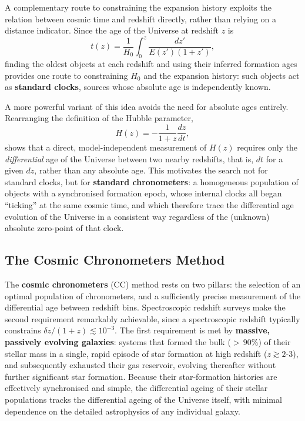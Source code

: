 A complementary route to constraining the expansion history exploits the relation between cosmic time and redshift directly, rather than relying on a distance indicator. Since the age of the Universe at redshift $z$ is
$$
t(z) = \frac{1}{H_0}\int_0^z \frac{dz'}{E(z')(1+z')} ,
$$
finding the oldest objects at each redshift and using their inferred formation ages provides one route to constraining $H_0$ and the expansion history: such objects act as \textbf{standard clocks}, sources whose absolute age is independently known.

\smallskip

A more powerful variant of this idea avoids the need for absolute ages entirely. Rearranging the definition of the Hubble parameter,
$$
H(z) = -\frac{1}{1+z}\frac{dz}{dt} ,
$$
shows that a direct, model-independent measurement of $H(z)$ requires only the \textit{differential} age of the Universe between two nearby redshifts, that is, $dt$ for a given $dz$, rather than any absolute age. This motivates the search not for standard clocks, but for \textbf{standard chronometers}: a homogeneous population of objects with a synchronised formation epoch, whose internal clocks all began ``ticking'' at the same cosmic time, and which therefore trace the differential age evolution of the Universe in a consistent way regardless of the (unknown) absolute zero-point of that clock.

\subsection{The Cosmic Chronometers Method} \label{subsec:cc_method}

The \textbf{cosmic chronometers} (CC) method rests on two pillars: the selection of an optimal population of chronometers, and a sufficiently precise measurement of the differential age between redshift bins. Spectroscopic redshift surveys make the second requirement remarkably achievable, since a spectroscopic redshift typically constrains $\delta z/(1+z) \lesssim 10^{-3}$. The first requirement is met by \textbf{massive, passively evolving galaxies}: systems that formed the bulk (${>}\,90\%$) of their stellar mass in a single, rapid episode of star formation at high redshift ($z \gtrsim 2$-$3$), and subsequently exhausted their gas reservoir, evolving thereafter without further significant star formation. Because their star-formation histories are effectively synchronised and simple, the differential ageing of their stellar populations tracks the differential ageing of the Universe itself, with minimal dependence on the detailed astrophysics of any individual galaxy.

